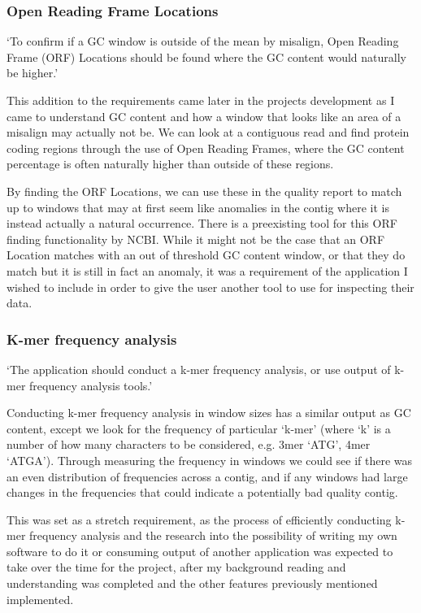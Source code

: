 \subsubsection{Open Reading Frame Locations}
`To confirm if a GC window is outside of the mean by misalign, Open Reading Frame (ORF) Locations should be found where the GC content would naturally be higher.'

This addition to the requirements came later in the projects development as I came to understand GC content and how a window that looks like an area of a misalign may actually not be. We can look at a contiguous read and find protein coding regions through the use of Open Reading Frames\cite{orfdefinition}, where the GC content percentage is often naturally higher than outside of these regions.

By finding the ORF Locations, we can use these in the quality report to match up to windows that may at first seem like anomalies in the contig where it is instead actually a natural occurrence. There is a preexisting tool for this ORF finding functionality by NCBI\cite{orffinder}. While it might not be the case that an ORF Location matches with an out of threshold GC content window, or that they do match but it is still in fact an anomaly, it was a requirement of the application I wished to include in order to give the user another tool to use for inspecting their data.

\subsubsection{K-mer frequency analysis}
`The application should conduct a k-mer frequency analysis, or use output of k-mer frequency analysis tools.'

Conducting k-mer frequency analysis in window sizes has a similar output as GC content, except we look for the frequency of particular `k-mer' (where `k' is a number of how many characters to be considered, e.g. 3mer `ATG', 4mer `ATGA'). Through measuring the frequency in windows we could see if there was an even distribution of frequencies across a contig, and if any windows had large changes in the frequencies that could indicate a potentially bad quality contig.

This was set as a stretch requirement, as the process of efficiently conducting k-mer frequency analysis and the research into the possibility of writing my own software to do it or consuming output of another application was expected to take over the time for the project, after my background reading and understanding was completed and the other features previously mentioned implemented.

